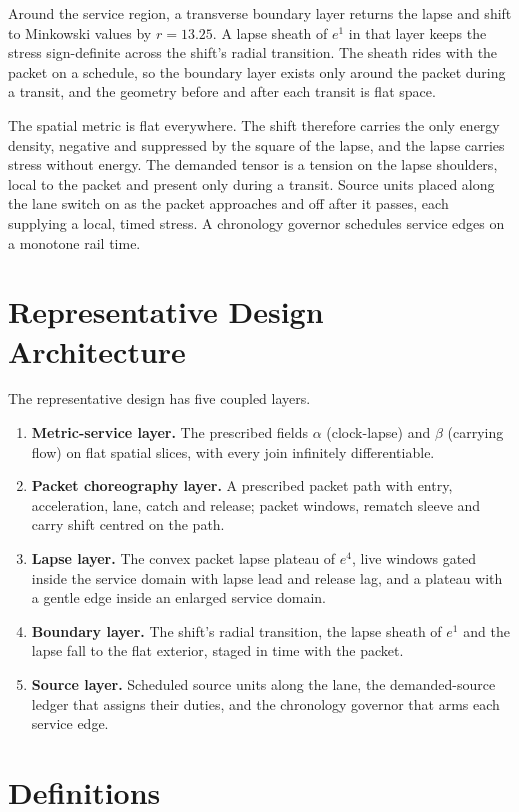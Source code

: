 \documentclass[11pt]{article}
\begin{document}
Around the service region, a transverse boundary layer returns the lapse and shift to Minkowski values by $r=13.25$. A lapse sheath of $e^{1}$ in that layer keeps the stress sign-definite across the shift's radial transition. The sheath rides with the packet on a schedule, so the boundary layer exists only around the packet during a transit, and the geometry before and after each transit is flat space.

The spatial metric is flat everywhere. The shift therefore carries the only energy density, negative and suppressed by the square of the lapse, and the lapse carries stress without energy. The demanded tensor is a tension on the lapse shoulders, local to the packet and present only during a transit. Source units placed along the lane switch on as the packet approaches and off after it passes, each supplying a local, timed stress. A chronology governor schedules service edges on a monotone rail time.

\section{Representative Design Architecture}

The representative design has five coupled layers.
\begin{enumerate}
\item \textbf{Metric-service layer.} The prescribed fields $\alpha$ (clock-lapse) and $\beta$ (carrying flow) on flat spatial slices, with every join infinitely differentiable.
\item \textbf{Packet choreography layer.} A prescribed packet path with entry, acceleration, lane, catch and release; packet windows, rematch sleeve and carry shift centred on the path.
\item \textbf{Lapse layer.} The convex packet lapse plateau of $e^{4}$, live windows gated inside the service domain with lapse lead and release lag, and a plateau with a gentle edge inside an enlarged service domain.
\item \textbf{Boundary layer.} The shift's radial transition, the lapse sheath of $e^{1}$ and the lapse fall to the flat exterior, staged in time with the packet.
\item \textbf{Source layer.} Scheduled source units along the lane, the demanded-source ledger that assigns their duties, and the chronology governor that arms each service edge.
\end{enumerate}

\section{Definitions}
\end{document}
